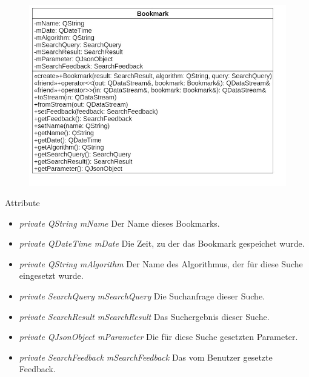 \begin{figure}[H]
\centering
\includegraphics[scale=0.5]{img/Klassendiagramm/Klassen/Model/Bookmark}
\label{fig:bookmark}
\end{figure}

Attribute
\begin{itemize}
\item\textit{private QString mName} Der Name dieses Bookmarks.
\item\textit{private QDateTime mDate} Die Zeit, zu der das Bookmark gespeichet wurde.
\item\textit{private QString mAlgorithm} Der Name des Algorithmus, der für diese Suche eingesetzt wurde.
\item\textit{private SearchQuery mSearchQuery} Die Suchanfrage dieser Suche.
\item\textit{private SearchResult mSearchResult} Das Suchergebnis dieser Suche.
\item\textit{private QJsonObject mParameter} Die für diese Suche gesetzten Parameter.
\item\textit{private SearchFeedback mSearchFeedback} Das vom Benutzer gesetzte Feedback.
\end{itemize}


